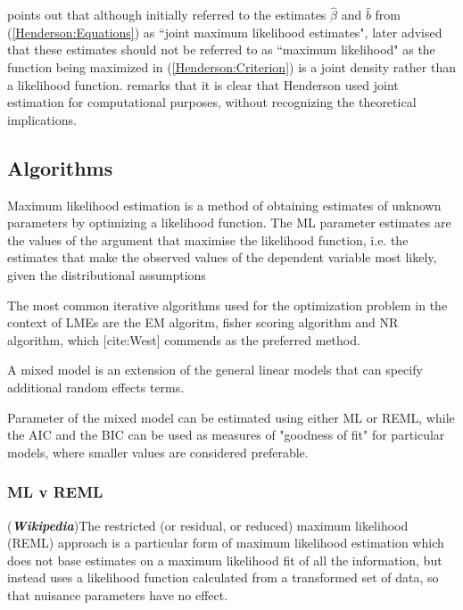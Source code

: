 \documentclass[12pt, a4paper]{report}
\theoremstyle{plain}
\theoremstyle{definition}
\theoremstyle{remark}
\begin{document}
	\cite{Robi:BLUP:1991} points out that although \cite{Henderson:1950} initially referred to the estimates $\hat{\beta}$ and $\hat{b}$ from (\ref{Henderson:Equations}) as ``joint maximum likelihood estimates", \cite{Henderson:1973} later advised that these estimates should not be referred to as ``maximum likelihood" as the function being maximized in (\ref{Henderson:Criterion}) is a joint density rather than a likelihood function. \cite{Lee:Neld:Pawi:2006} remarks that it is clear that Henderson used joint estimation for computational purposes, without recognizing the theoretical implications.
	
	
	\subsection{Algorithms}
	Maximum likelihood estimation is a method of obtaining estimates
	of unknown parameters by optimizing a likelihood function. The ML
	parameter estimates are the values of the argument that maximise
	the likelihood function, i.e. the estimates that make the observed
	values of the dependent variable most likely, given the
	distributional assumptions
	
	The most common iterative algorithms used for the optimization
	problem in the context of LMEs are the EM algoritm, fisher scoring
	algorithm and NR algorithm, which [cite:West] commends as the
	preferred method.
	
	A mixed model is an extension of the general linear models that
	can specify additional random effects terms.
	
	Parameter of the mixed model can be estimated using either ML or
	REML, while the AIC and the BIC can be used as measures of
	"goodness of fit" for particular models, where smaller values are
	considered preferable.
	
	
	\newpage
	
	\subsubsection{ML v REML}
	(\textbf{\emph{Wikipedia}})The restricted (or residual, or reduced) maximum likelihood (REML) approach is a particular form of maximum likelihood estimation which does not base estimates on a maximum likelihood fit of all the information, but instead uses a likelihood function calculated from a transformed set of data, so that nuisance parameters have no effect.
	
\end{document}

